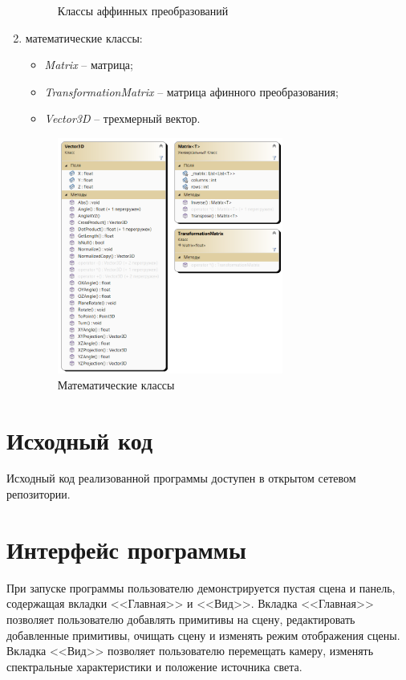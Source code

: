 \begin{enumerate}
\begin{figure}[h]
		\caption{Классы аффинных преобразований} 
		\label{fig:transformation-class} 
	\end{figure}
	\item математические классы:
	\begin{itemize}[label=--]
		\item \textit{Matrix} -- матрица;
		\item \textit{TransformationMatrix} -- матрица афинного преобразования;
		\item \textit{Vector3D} -- трехмерный вектор.
	\end{itemize}
	\begin{figure}[h] 
		\centering
		\includegraphics[width=0.7\textwidth]{images/math-class.png}
		\caption{Математические классы} 
		\label{fig:math-class} 
	\end{figure}
\end{enumerate}

\section{Исходный код}

Исходный код реализованной программы доступен в открытом сетевом репозитории.

\section{Интерфейс программы}

При запуске программы пользователю демонстрируется пустая сцена и панель, содержащая вкладки <<Главная>> и <<Вид>>. Вкладка <<Главная>> позволяет пользователю добавлять примитивы на сцену, редактировать добавленные примитивы, очищать сцену и изменять режим отображения сцены. Вкладка <<Вид>> позволяет пользователю перемещать камеру, изменять спектральные характеристики и положение источника света.

